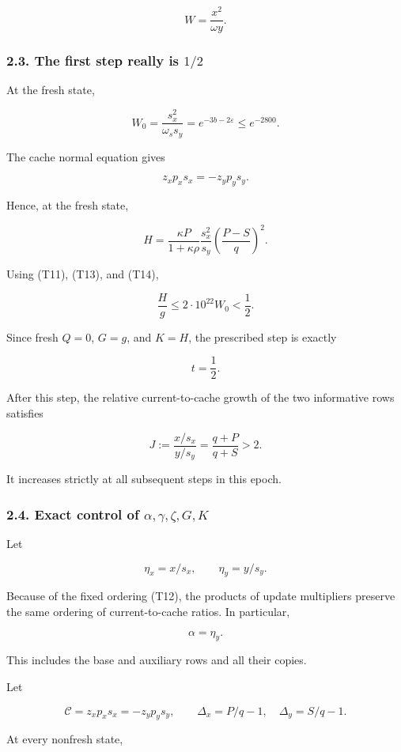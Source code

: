 \[
W=\frac{x^2}{\omega y}.
\tag{T17}
\]

\subsubsection{2.3. The first step really is \texorpdfstring{$1/2$}{one half}}

At the fresh state,

\[
W_0=\frac{s_x^2}{\omega_s s_y}
=e^{-3b-2\varepsilon}\le e^{-2800}.
\tag{T18}
\]

The cache normal equation gives

\[
z_xp_xs_x=-z_yp_ys_y.
\]

Hence, at the fresh state,

\[
H=
\frac{\kappa P}{1+\kappa\rho}
\frac{s_x^2}{s_y}
\left(\frac{P-S}{q}\right)^2.
\]

Using (T11), (T13), and (T14),

\[
\frac Hg\le 2\cdot10^{22}W_0<\frac12.
\tag{T19}
\]

Since fresh \(Q=0\), \(G=g\), and \(K=H\), the prescribed step is exactly

\[
t=\frac12.
\tag{T20}
\]

After this step, the relative current-to-cache growth of the two informative rows satisfies

\[
J:=\frac{x/s_x}{y/s_y}
=\frac{q+P}{q+S}>2.
\tag{T21}
\]

It increases strictly at all subsequent steps in this epoch.

\subsubsection{2.4. Exact control of \texorpdfstring{$\alpha,\gamma,\zeta,G,K$}{alpha, gamma, zeta, G, K}}

Let

\[
\eta_x=x/s_x,\qquad \eta_y=y/s_y.
\]

Because of the fixed ordering (T12), the products of update multipliers preserve the same ordering of current-to-cache ratios. In particular,

\[
\boxed{\alpha=\eta_y.}
\tag{T22}
\]

This includes the base and auxiliary rows and all their copies.

Let

\[
\mathcal C=z_xp_xs_x=-z_yp_ys_y,
\qquad
\Delta_x=P/q-1,\quad \Delta_y=S/q-1.
\]

At every nonfresh state,

